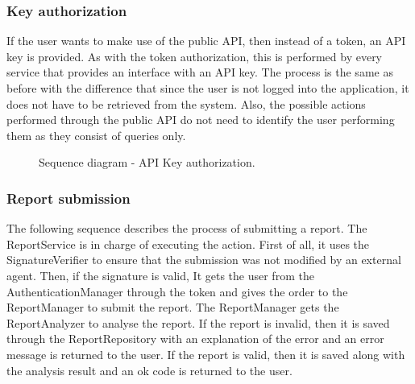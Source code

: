 \subsubsection{Key authorization}
If the user wants to make use of the public API, then instead of a token, an API key is provided. As with the token authorization, this is performed by every service that provides an interface with an API key. The process is the same as before with the difference that since the user is not logged into the application, it does not have to be retrieved from the system. Also, the possible actions performed through the public API do not need to identify the user performing them as they consist of queries only.
\begin{figure}[H]
    \centering
    \caption{\label{fig:sequence-api-key-auth}Sequence diagram - API Key authorization.}
\end{figure}

\subsubsection{Report submission}
The following sequence describes the process of submitting a report.
The ReportService is in charge of executing the action. First of all, it uses the SignatureVerifier to ensure that the submission was not modified by an external agent. Then, if the signature is valid, It gets the user from the AuthenticationManager through the token and gives the order to the ReportManager to submit the report. The ReportManager gets the ReportAnalyzer to analyse the report. If the report is invalid, then it is saved through the ReportRepository with an explanation of the error and an error message is returned to the user. If the report is valid, then it is saved along with the analysis result and an ok code is returned to the user.

